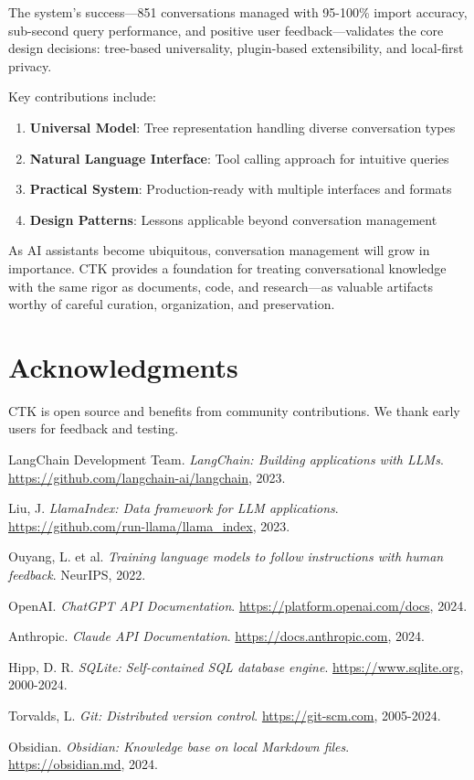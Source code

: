 \documentclass[11pt,letterpaper]{article}
\begin{document}
The system's success---851 conversations managed with 95-100\% import accuracy, sub-second query performance, and positive user feedback---validates the core design decisions: tree-based universality, plugin-based extensibility, and local-first privacy.

Key contributions include:

\begin{enumerate}
    \item \textbf{Universal Model}: Tree representation handling diverse conversation types
    \item \textbf{Natural Language Interface}: Tool calling approach for intuitive queries
    \item \textbf{Practical System}: Production-ready with multiple interfaces and formats
    \item \textbf{Design Patterns}: Lessons applicable beyond conversation management
\end{enumerate}

As AI assistants become ubiquitous, conversation management will grow in importance. CTK provides a foundation for treating conversational knowledge with the same rigor as documents, code, and research---as valuable artifacts worthy of careful curation, organization, and preservation.

\section*{Acknowledgments}

CTK is open source and benefits from community contributions. We thank early users for feedback and testing.

\begin{thebibliography}{9}

LangChain Development Team.
\textit{LangChain: Building applications with LLMs}.
\url{https://github.com/langchain-ai/langchain}, 2023.

Liu, J.
\textit{LlamaIndex: Data framework for LLM applications}.
\url{https://github.com/run-llama/llama_index}, 2023.

Ouyang, L. et al.
\textit{Training language models to follow instructions with human feedback}.
NeurIPS, 2022.

OpenAI.
\textit{ChatGPT API Documentation}.
\url{https://platform.openai.com/docs}, 2024.

Anthropic.
\textit{Claude API Documentation}.
\url{https://docs.anthropic.com}, 2024.

Hipp, D. R.
\textit{SQLite: Self-contained SQL database engine}.
\url{https://www.sqlite.org}, 2000-2024.

Torvalds, L.
\textit{Git: Distributed version control}.
\url{https://git-scm.com}, 2005-2024.

Obsidian.
\textit{Obsidian: Knowledge base on local Markdown files}.
\url{https://obsidian.md}, 2024.

\end{thebibliography}
\end{document}
